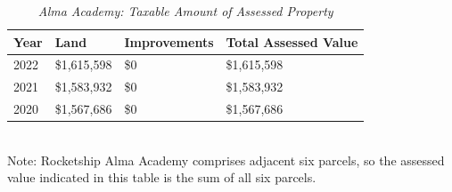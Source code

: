 \begin{table}[hbt]
  \SingleSpacing%
  \caption[Alma Academy: Taxable Amount of Assessed Propery]{\textit{Alma Academy: Taxable Amount of Assessed Property}}\label{tab:alma-academy-taxable-amount}
  \begin{tabular}{llll}
    \toprule
    Year & Land        & Improvements & Total Assessed Value \\
    \midrule
    2022 & \$1,615,598 & \$0          & \$1,615,598 \\
    2021 & \$1,583,932 & \$0          & \$1,583,932 \\
    2020 & \$1,567,686 & \$0          & \$1,567,686 \\
    \bottomrule
  \end{tabular}\\\newline
  \noindent\footnotesize{Note: Rocketship Alma Academy comprises adjacent six parcels, so the assessed value indicated in this table is the sum of all six parcels.}
\end{table}

